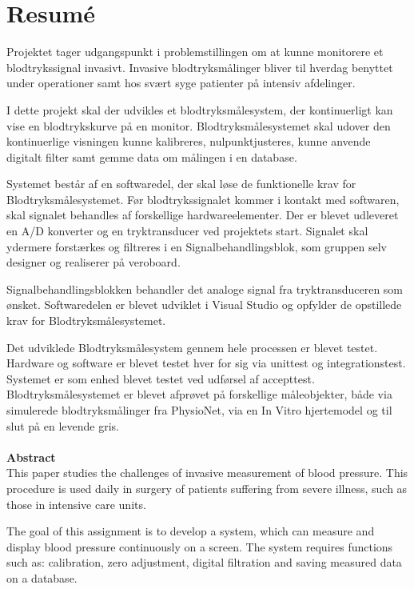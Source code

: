 \chapter{Resumé}
Projektet tager udgangspunkt i problemstillingen om at kunne monitorere et blodtrykssignal invasivt. Invasive blodtryksmålinger bliver til hverdag benyttet under operationer samt hos svært syge patienter på intensiv afdelinger. 

I dette projekt skal der udvikles et blodtryksmålesystem, der kontinuerligt kan vise en blodtrykskurve på en monitor. Blodtryksmålesystemet skal udover den kontinuerlige visningen kunne kalibreres, nulpunktjusteres, kunne anvende digitalt filter samt gemme data om målingen i en database. 

Systemet består af en softwaredel, der skal løse de funktionelle krav for Blodtryksmålesystemet. Før blodtrykssignalet kommer i kontakt med softwaren, skal signalet behandles af forskellige hardwareelementer. Der er blevet udleveret en A/D konverter og en tryktransducer ved projektets start. Signalet skal ydermere forstærkes og filtreres i en Signalbehandlingsblok, som gruppen selv designer og realiserer på veroboard.

Signalbehandlingsblokken behandler det analoge signal fra tryktransduceren som ønsket. Softwaredelen er blevet udviklet i Visual Studio og opfylder de opstillede krav for Blodtryksmålesystemet. 

Det udviklede Blodtryksmålesystem gennem hele processen er blevet testet. Hardware og software er blevet testet hver for sig via unittest og integrationstest. Systemet er som enhed blevet testet ved udførsel af accepttest. Blodtryksmålesystemet er blevet afprøvet på forskellige måleobjekter, både via simulerede blodtryksmålinger fra PhysioNet, via en In Vitro hjertemodel og til slut på en levende gris.
\\\\


\textbf{Abstract}\\
This paper studies the challenges of invasive measurement of blood pressure. This procedure is used daily in surgery of patients suffering from severe illness, such as those in intensive care units. 

The goal of this assignment is to develop a system, which can measure and display blood pressure continuously on a screen. The system requires functions such as: calibration, zero adjustment, digital filtration and saving measured data on a database. 

